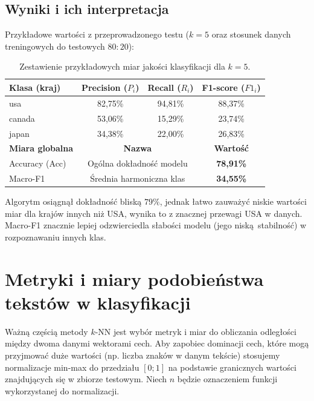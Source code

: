 \documentclass{article}
\begin{document}
	\subsection{Wyniki i ich interpretacja}
	Przykładowe wartości z przeprowadzonego testu (\(k = 5\) oraz stosunek danych treningowych do testowych \(80 : 20\)):\\
	\begin{table}[h!]
		\centering
		\begin{tabular}{|l|c|c|c|}
			\hline
			\textbf{Klasa (kraj)} & \textbf{Precision (\(P_i\))} & \textbf{Recall (\(R_i\))} & \textbf{F1-score (\(F1_i\))} \\ \hline
			usa & 82,75\%  & 94,81\% & 88,37\% \\ \hline
			canada & 53,06\% & 15,29\% & 23,74\% \\ \hline 
			japan & 34,38\% & 22,00\% & 26,83\% \\ \hline \hline
			
			\textbf{Miara globalna} & \multicolumn{2}{c|}{\textbf{Nazwa}} & \textbf{Wartość} \\ \hline
			Accuracy (Acc) & \multicolumn{2}{c|}{Ogólna dokładność modelu} & \textbf{78,91\%} \\ \hline
			Macro-F1 & \multicolumn{2}{c|}{Średnia harmoniczna klas} & \textbf{34,55\%} \\ \hline
		\end{tabular}
		\caption{Zestawienie przykładowych miar jakości klasyfikacji dla $k=5$.}
	\end{table}
	
	\noindent
	Algorytm osiągnął dokładność bliską \(79\%\), jednak łatwo zauważyć niskie wartości miar dla krajów innych niż USA, wynika to z znacznej przewagi USA w danych. Macro-F1 znacznie lepiej odzwierciedla słabości modelu (jego niską stabilność) w rozpoznawaniu innych klas.
	
	\newpage
	\section{Metryki i miary podobieństwa tekstów w klasyfikacji}
	
	Ważną częścią metody \(k\)-NN jest wybór metryk i miar do obliczania odległości między dwoma danymi wektorami cech. Aby zapobiec dominacji cech, które mogą przyjmować duże wartości (np. liczba znaków w danym tekście) stosujemy normalizacje min-max do przedziału \([0;1]\) na podstawie granicznych wartości znajdujących się w zbiorze testowym. Niech \(n\) będzie oznaczeniem funkcji wykorzystanej do normalizacji.
	
\end{document}
